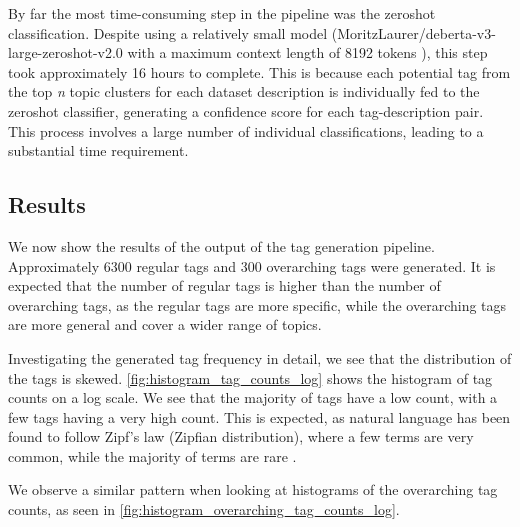 By far the most time-consuming step in the pipeline was the zeroshot classification. Despite using a relatively small model (MoritzLaurer/deberta-v3-large-zeroshot-v2.0 with a maximum context length of 8192 tokens \cite{noauthor_moritzlaurerdeberta-v3-large-zeroshot-v20_2024}), this step took approximately 16 hours to complete. This is because each potential tag from the top \textit{n} topic clusters for each dataset description is individually fed to the zeroshot classifier, generating a confidence score for each tag-description pair. This process involves a large number of individual classifications, leading to a substantial time requirement.



\subsection{Results}
We now show the results of the output of the tag generation pipeline. Approximately 6300 regular tags and 300 overarching tags were generated. It is expected that the number of regular tags is higher than the number of overarching tags, as the regular tags are more specific, while the overarching tags are more general and cover a wider range of topics.

Investigating the generated tag frequency in detail, we see that the distribution of the tags is skewed. \cref{fig:histogram_tag_counts_log} shows the histogram of tag counts on a log scale. We see that the majority of tags have a low count, with a few tags having a very high count. This is expected, as natural language has been found to follow Zipf's law (Zipfian distribution), where a few terms are very common, while the majority of terms are rare \cite{zipf_psycho-biology_1935, piantadosi_zipfs_2014}.

We observe a similar pattern when looking at histograms of the overarching tag counts, as seen in \cref{fig:histogram_overarching_tag_counts_log}.

